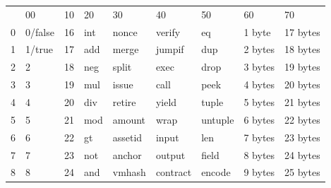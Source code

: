 \documentclass{article}
\begin{document}
\begin{figure}
\def\arraystretch{1.5}
\setlength\tabcolsep{5pt}
\centering\ttfamily\scriptsize
\begin{tabularx}{\textwidth}{lCCCCCCCC}
& 00 & 10 & 20 & 30 & 40 & 50 & 60 & 70 \\
0 &  0/false &  16 &  int       &  nonce     &  verify        &  eq      &  1 byte   &  17 bytes \\
1 &  1/true  &  17 &  add       &  merge     &  jumpif        &  dup     &  2 bytes  &  18 bytes \\
2 &  2         &  18 &  neg       &  split     &  exec          &  drop    &  3 bytes  &  19 bytes \\
3 &  3         &  19 &  mul       &  issue     &  call          &  peek    &  4 bytes  &  20 bytes \\
4 &  4         &  20 &  div       &  retire    &  yield         &  tuple   &  5 bytes  &  21 bytes \\
5 &  5         &  21 &  mod       &  amount    &  wrap          &  untuple &  6 bytes  &  22 bytes \\
6 &  6         &  22 &  gt        &  assetid   &  input         &  len     &  7 bytes  &  23 bytes \\
7 &  7         &  23 &  not       &  anchor    &  output        &  field   &  8 bytes  &  24 bytes \\
8 &  8         &  24 &  and       &  vmhash   &  contract      &  encode  &  9 bytes  &  25 bytes \\

\end{tabularx}
\end{figure}
\end{document}
